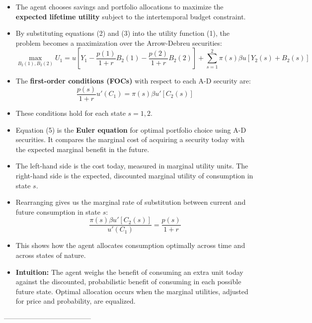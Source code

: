 \documentclass[12pt]{article}
\begin{document}
\begin{itemize}
\item The agent chooses savings and portfolio allocations to maximize the \textbf{expected lifetime utility} subject to the intertemporal budget constraint.

\item By substituting equations (2) and (3) into the utility function (1), the problem becomes a maximization over the Arrow-Debreu securities:
\[
\max_{B_2(1), B_2(2)} U_1 = u\left[ Y_1 - \frac{p(1)}{1 + r} B_2(1) - \frac{p(2)}{1 + r} B_2(2) \right] + \sum_{s = 1}^{2} \pi(s) \beta u[Y_2(s) + B_2(s)]
\]

\item The \textbf{first-order conditions (FOCs)} with respect to each A-D security are:
\[
\frac{p(s)}{1 + r} u'(C_1) = \pi(s) \beta u'[C_2(s)] \tag{5}
\]

\item These conditions hold for each state \( s = 1, 2 \).

\item Equation (5) is the \textbf{Euler equation} for optimal portfolio choice using A-D securities. It compares the marginal cost of acquiring a security today with the expected marginal benefit in the future.

\item The left-hand side is the cost today, measured in marginal utility units. The right-hand side is the expected, discounted marginal utility of consumption in state \( s \).

\item Rearranging gives us the marginal rate of substitution between current and future consumption in state \( s \):
\[
\frac{\pi(s) \beta u'[C_2(s)]}{u'(C_1)} = \frac{p(s)}{1 + r} \tag{6}
\]

\item This shows how the agent allocates consumption optimally across time and across states of nature.
  
\item \textbf{Intuition:} The agent weighs the benefit of consuming an extra unit today against the discounted, probabilistic benefit of consuming in each possible future state. Optimal allocation occurs when the marginal utilities, adjusted for price and probability, are equalized.

\end{itemize}

--------------------------------------
\end{document}
